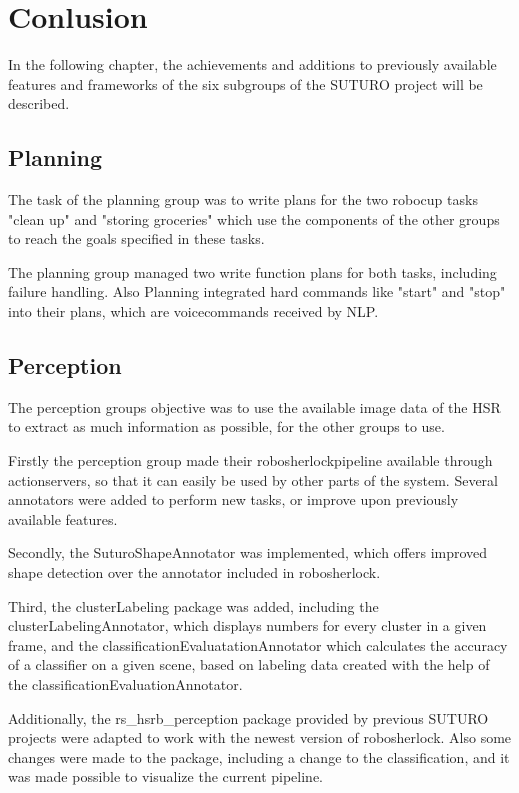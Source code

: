 \documentclass[main.tex]{subfiles}
\begin{document}
	\begingroup

	\renewcommand{\cleardoublepage}{}

	\renewcommand{\clearpage}{}

	\chapter{Conlusion}
		In the following chapter, the achievements and additions to previously available features and frameworks of the six subgroups of the SUTURO project will be described.
		
		\section{Planning}
		The task of the planning group was to write plans for the two robocup tasks "clean up" and "storing groceries" which use the components of the other groups to reach the goals specified in these tasks.
		
		The planning group managed two write function plans for both tasks, including failure handling. Also Planning integrated hard commands like "start" and "stop" into their plans, which are voicecommands received by NLP.
		
		\section{Perception}
		The perception groups objective was to use the available image data of the HSR to extract as much information as possible, for the other groups to use.
				
		Firstly the perception group made their robosherlockpipeline available through actionservers, so that it can easily be used by other parts of the system. Several annotators were added to perform new tasks, or improve upon previously available features. 
		
		Secondly, the SuturoShapeAnnotator was implemented, which offers improved shape detection over the annotator included in robosherlock. 
		
		Third, the clusterLabeling package was added, including the clusterLabelingAnnotator, which displays numbers for every cluster in a given frame, and the classificationEvaluatationAnnotator which calculates the accuracy of a classifier on a given scene, based on labeling data created with the help of the classificationEvaluationAnnotator. 
		
		Additionally, the rs\_hsrb\_perception package provided by previous SUTURO projects were adapted to work with the newest version of robosherlock. Also some changes were made to the package, including a change to the classification, and it was made possible to visualize the current pipeline.
		
\end{document}
